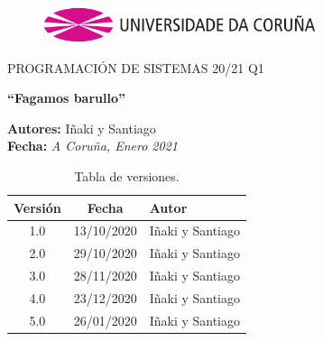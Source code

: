 \documentclass[a4paper,12pt]{article}
\begin{document}
\begin{titlepage}

\begin{center}
\vspace*{-1in}
\begin{figure}[htb]
\begin{center}
\includegraphics[width=8cm]{udc.eps}
\end{center}
\end{figure}

\vspace*{1in}
PROGRAMACIÓN DE SISTEMAS 20/21 Q1\\
\vspace*{1in}
\begin{Large}
\textbf{``Fagamos barullo''} \\
\end{Large}
\vspace*{3in}
\begin{large}
\raggedleft
\textbf{Autores:} Iñaki y Santiago \\
\textbf{Fecha:} \textit{A Coruña, Enero 2021}\\
\end{large}
\end{center}
\end{titlepage}
\tableofcontents
\thispagestyle{empty}
\newpage
\begin{flushright}
\begin{table}[hbtp]
\begin{center}
\caption{Tabla de versiones.}
\label{tabla:versiones}
\small
\vspace{1ex}
\begin{tabular}{|c|c|l|}
\hline
Versión & Fecha & Autor \\
\hline \hline
1.0 & 13/10/2020 & Iñaki y Santiago\\
2.0 & 29/10/2020 & Iñaki y Santiago\\
3.0 & 28/11/2020 & Iñaki y Santiago\\
4.0 & 23/12/2020 & Iñaki y Santiago\\
5.0 & 26/01/2020 & Iñaki y Santiago\\
\hline
\end{tabular}
\end{center}
\end{table}
\end{flushright}
\thispagestyle{empty}
\newpage
{}
\end{document}
